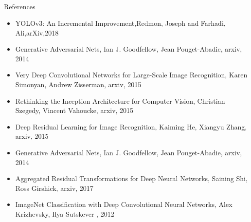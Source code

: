 \documentclass{beamer}
\begin{document}
\subsection{}
\begin{frame}{References}
\begin{itemize}
\item{YOLOv3: An Incremental Improvement,Redmon, Joseph and Farhadi, Ali,arXiv,2018}
\item{Generative Adversarial Nets, Ian J. Goodfellow, Jean Pouget-Abadie, arxiv, 2014}
\item{Very Deep Convolutional Networks for Large-Scale Image Recognition, Karen Simonyan, Andrew Zisserman, arxiv, 2015}
\item{Rethinking the Inception Architecture for Computer Vision, Christian Szegedy, Vincent Vahoucke, arxiv, 2015}
\item{Deep Residual Learning for Image Recognition, Kaiming He, Xiangyu Zhang, arxiv, 2015}
\item{Generative Adversarial Nets, Ian J. Goodfellow, Jean Pouget-Abadie, arxiv, 2014}
\item{Aggregated Residual Transformations for Deep Neural Networks, Saining Shi, Ross Girshick, arxiv, 2017}
\item{ImageNet Classification with Deep Convolutional Neural Networks, Alex Krizhevsky, Ilya Sutskever , 2012}





\end{itemize}
\end{frame}
\end{document}

